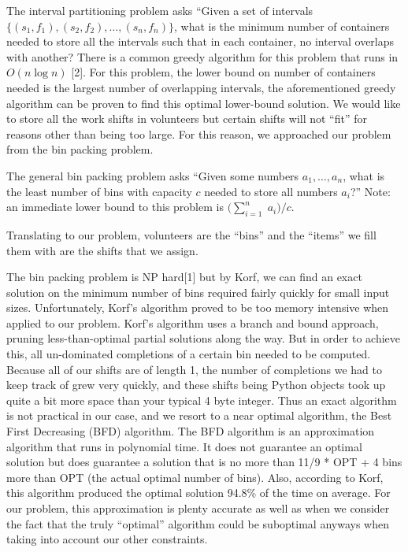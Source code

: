 \documentclass[11pt]{article}
\theoremstyle{definition}
\begin{document}
\begin{multicols}{2}
The interval partitioning problem asks ``Given a set of intervals $\{(s_1, f_1), (s_2, f_2), \ldots, (s_n, f_n)\}$, what is the minimum number of containers needed to store all the intervals such that in each container, no interval overlaps with another?
There is a common greedy algorithm for this problem that runs in $O(n\log n)$ [2].
For this problem, the lower bound on number of containers needed is the largest number of overlapping intervals, the aforementioned greedy algorithm can be proven to find this optimal lower-bound solution.
We would like to store all the work shifts in volunteers but certain shifts will not ``fit'' for reasons other than being too large.
For this reason, we approached our problem from the bin packing problem.

The general bin packing problem asks ``Given some numbers $a_1, \ldots, a_n$, what is the least number of bins with capacity $c$ needed to store all numbers $a_i$?''
Note: an immediate lower bound to this problem is $\big(\sum_{i = 1}^{n}\;a_i\big)/c$.

Translating to our problem, volunteers are the ``bins'' and the ``items'' we fill them with are the shifts that we assign.

The bin packing problem is NP hard[1] but by Korf, we can find an exact solution on the minimum number of bins required fairly quickly for small input sizes.
Unfortunately, Korf's algorithm proved to be too memory intensive when applied to our problem.
Korf's algorithm uses a branch and bound approach, pruning less-than-optimal partial solutions along the way.
But in order to achieve this, all un-dominated completions of a certain bin needed to be computed.
Because all of our shifts are of length 1, the number of completions we had to keep track of grew very quickly, and these shifts being Python objects took up quite a bit more space than your typical 4 byte integer.
Thus an exact algorithm is not practical in our case, and we resort to a near optimal algorithm, the Best First Decreasing (BFD) algorithm.
The BFD algorithm is an approximation algorithm that runs in polynomial time. It does not guarantee an optimal solution but does guarantee a solution that is no more than 11/9 * OPT + 4 bins more than OPT (the actual optimal number of bins). Also, according to Korf, this algorithm produced the optimal solution 94.8\% of the time on average.
For our problem, this approximation is plenty accurate as well as when we consider the fact that the truly ``optimal'' algorithm could be suboptimal anyways when taking into account our other constraints.


\end{multicols}
\end{document}
